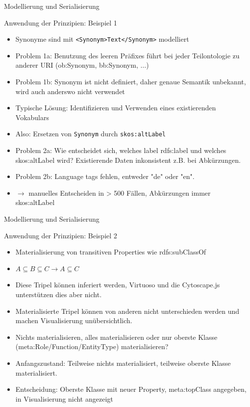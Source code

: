 \documentclass[14pt,aspectratio=1610]{beamer}
\begin{document}
\begin{frame}[fragile]{Modellierung und Serialisierung}
\begin{block}{Anwendung der Prinzipien: Beispiel 1}
\begin{itemize}
\item Synonyme sind mit \texttt{<Synonym>Text</Synonym>} modelliert 
\item Problem 1a: Benutzung des leeren Präfixes führt bei jeder Teilontologie zu anderer URI (ob:Synonym, bb:Synonym, $\ldots$) 
\item Problem 1b: Synonym ist nicht definiert, daher genaue Semantik unbekannt, wird auch anderswo nicht verwendet
\item Typische Lösung: Identifizieren und Verwenden eines existierenden Vokabulars
\item Also: Ersetzen von \texttt{Synonym} durch \texttt{skos:altLabel}
\item Problem 2a: Wie entscheidet sich, welches label rdfs:label und welches skos:altLabel wird? Existierende Daten inkonsistent z.B. bei Abkürzungen. 
\item Problem 2b: Language tags fehlen, entweder "de" oder "en".
\item $\rightarrow$ manuelles Entscheiden in > 500 Fällen, Abkürzungen immer skos:altLabel
\end{itemize}
\end{block}
\end{frame}

\begin{frame}[fragile]{Modellierung und Serialisierung}
\begin{block}{Anwendung der Prinzipien: Beispiel 2}
\begin{itemize}
\item Materialisierung von transitiven Properties wie rdfs:subClassOf
\item $A \subseteq B \subseteq C \rightarrow A \subseteq C$
\item Diese Tripel können inferiert werden, Virtuoso und die Cytoscape.js unterstützen dies aber nicht.
\item Materialisierte Tripel können von anderen nicht unterschieden werden und machen Visualisierung unübersichtlich.
\item Nichts materialisieren, alles materialisieren oder nur oberste Klasse (meta:Role/Function/EntityType) materialisieren?
\item Anfangszustand: Teilweise nichts materialisiert, teilweise oberste Klasse materialisiert.
\item Entscheidung: Oberste Klasse mit neuer Property, meta:topClass angegeben, in Visualisierung nicht angezeigt
\end{itemize}
\end{block}
\end{frame}
\end{document}
